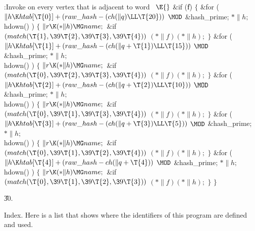 \B{}:Invoke  on every vertex that is adjacent to word~%
\X${}\E{}$\6
\&{if} (\|f) $\{$ \&{for} ( $\|h\K\\{htab}[\T{0}]+(\\{raw\_hash}-(\\{ch}(\|q)%
\LL\T{20}))$ $\MOD$ \&{hash\_prime};\7
${}{*}\|h;$ \\{hdown}() ) \6
${}\{{}$\1\6
${}\|r\K({*}\|h)\MG\\{name};{}$\6
\&{if} ${}(\\{match}(\T{1},\39\T{2},\39\T{3},\39\T{4})){}$\1\5
${}({*}\|f)({*}\|h);{}$\2\6
\4${}\}{}$\2\6
\&{for} ( $\|h\K\\{htab}[\T{1}]+(\\{raw\_hash}-(\\{ch}(\|q+\T{1})\LL\T{15}))$ $%
\MOD$ \&{hash\_prime};\7
${}{*}\|h;$ \\{hdown}() ) \6
${}\{{}$\1\6
${}\|r\K({*}\|h)\MG\\{name};{}$\6
\&{if} ${}(\\{match}(\T{0},\39\T{2},\39\T{3},\39\T{4})){}$\1\5
${}({*}\|f)({*}\|h);{}$\2\6
\4${}\}{}$\2\6
\&{for} ( $\|h\K\\{htab}[\T{2}]+(\\{raw\_hash}-(\\{ch}(\|q+\T{2})\LL\T{10}))$ $%
\MOD$ \&{hash\_prime};\7
${}{*}\|h;$ \\{hdown}() ) \6
${}\{{}$\1\6
${}\|r\K({*}\|h)\MG\\{name};{}$\6
\&{if} ${}(\\{match}(\T{0},\39\T{1},\39\T{3},\39\T{4})){}$\1\5
${}({*}\|f)({*}\|h);{}$\2\6
\4${}\}{}$\2\6
\&{for} ( $\|h\K\\{htab}[\T{3}]+(\\{raw\_hash}-(\\{ch}(\|q+\T{3})\LL\T{5}))$ $%
\MOD$ \&{hash\_prime};\7
${}{*}\|h;$ \\{hdown}() ) \6
${}\{{}$\1\6
${}\|r\K({*}\|h)\MG\\{name};{}$\6
\&{if} ${}(\\{match}(\T{0},\39\T{1},\39\T{2},\39\T{4})){}$\1\5
${}({*}\|f)({*}\|h);{}$\2\6
\4${}\}{}$\2\6
\&{for} ( $\|h\K\\{htab}[\T{4}]+(\\{raw\_hash}-\\{ch}(\|q+\T{4}))$ $\MOD$ %
\&{hash\_prime};\7
${}{*}\|h;$ \\{hdown}() ) \6
${}\{{}$\1\6
${}\|r\K({*}\|h)\MG\\{name};{}$\6
\&{if} ${}(\\{match}(\T{0},\39\T{1},\39\T{2},\39\T{3})){}$\1\5
${}({*}\|f)({*}\|h);{}$\2\6
\4${}\}{}$\2\6
$\}{}$\par
\U30.\fi

Index. Here is a list that shows where the identifiers of this program
are
defined and used.
\fi

\inx
\fin
\con
